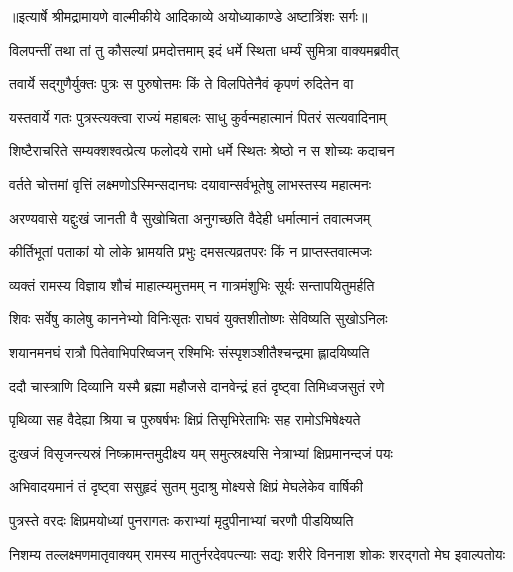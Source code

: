 {॥इत्यार्षे श्रीमद्रामायणे वाल्मीकीये आदिकाव्ये अयोध्याकाण्डे अष्टात्रिंशः सर्गः॥}


\twolineshloka
{विलपन्तीं तथा तां तु कौसल्यां प्रमदोत्तमाम्}
{इदं धर्मे स्थिता धर्म्यं सुमित्रा वाक्यमब्रवीत्} %

\twolineshloka
{तवार्ये सद्गुणैर्युक्तः पुत्रः स पुरुषोत्तमः}
{किं ते विलपितेनैवं कृपणं रुदितेन वा} %

\twolineshloka
{यस्तवार्ये गतः पुत्रस्त्यक्त्वा राज्यं महाबलः}
{साधु कुर्वन्महात्मानं पितरं सत्यवादिनाम्} %

\twolineshloka
{शिष्टैराचरिते सम्यक्शश्वत्प्रेत्य फलोदये}
{रामो धर्मे स्थितः श्रेष्ठो न स शोच्यः कदाचन} %

\twolineshloka
{वर्तते चोत्तमां वृत्तिं लक्ष्मणोऽस्मिन्सदानघः}
{दयावान्सर्वभूतेषु लाभस्तस्य महात्मनः} %

\twolineshloka
{अरण्यवासे यद्दुःखं जानती वै सुखोचिता}
{अनुगच्छति वैदेही धर्मात्मानं तवात्मजम्} %

\twolineshloka
{कीर्तिभूतां पताकां यो लोके भ्रामयति प्रभुः}
{दमसत्यव्रतपरः किं न प्राप्तस्तवात्मजः} %

\twolineshloka
{व्यक्तं रामस्य विज्ञाय शौचं माहात्म्यमुत्तमम्}
{न गात्रमंशुभिः सूर्यः सन्तापयितुमर्हति} %

\twolineshloka
{शिवः सर्वेषु कालेषु काननेभ्यो विनिःसृतः}
{राघवं युक्तशीतोष्णः सेविष्यति सुखोऽनिलः} %

\twolineshloka
{शयानमनघं रात्रौ पितेवाभिपरिष्वजन्}
{रश्मिभिः संस्पृशञ्शीतैश्चन्द्रमा ह्लादयिष्यति} %

\twolineshloka
{ददौ चास्त्राणि दिव्यानि यस्मै ब्रह्मा महौजसे}
{दानवेन्द्रं हतं दृष्ट्वा तिमिध्वजसुतं रणे} %

\twolineshloka
{पृथिव्या सह वैदेह्या श्रिया च पुरुषर्षभः}
{क्षिप्रं तिसृभिरेताभिः सह रामोऽभिषेक्ष्यते} %

\twolineshloka
{दुःखजं विसृजन्त्यस्रं निष्क्रामन्तमुदीक्ष्य यम्}
{समुत्स्रक्ष्यसि नेत्राभ्यां क्षिप्रमानन्दजं पयः} %

\twolineshloka
{अभिवादयमानं तं दृष्ट्वा ससुहृदं सुतम्}
{मुदाश्रु मोक्ष्यसे क्षिप्रं मेघलेकेव वार्षिकी} %

\twolineshloka
{पुत्रस्ते वरदः क्षिप्रमयोध्यां पुनरागतः}
{कराभ्यां मृदुपीनाभ्यां चरणौ पीडयिष्यति} %

\fourlineindentedshloka
{निशम्य तल्लक्ष्मणमातृवाक्यम्}
{रामस्य मातुर्नरदेवपत्न्याः}
{सद्यः शरीरे विननाश शोकः}
{शरद्गतो मेघ इवाल्पतोयः} %


